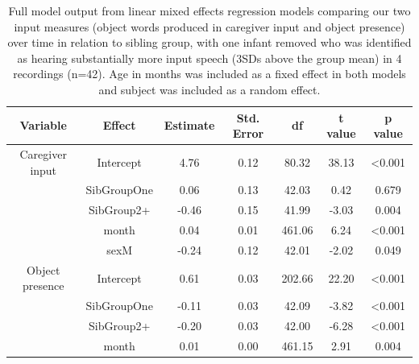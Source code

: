 \documentclass[
  english,
  man,floatsintext]{apa6}
\begin{document}
\begin{longtable}[t]{ccccccc}
\caption{\label{tab:table-input-model-summary-red}Full model output from linear mixed effects regression models comparing our two input measures (object words produced in caregiver input and object presence) over time in relation to sibling group, with one infant removed who was identified as hearing substantially more input speech (3SDs above the group mean) in 4 recordings (n=42). Age in months was included as a fixed effect in both models and subject was included as a random effect.}\\
\toprule
Variable & Effect & Estimate & Std. Error & df & t value & p value\\
\midrule
Caregiver input & Intercept & 4.76 & 0.12 & 80.32 & 38.13 & <0.001\\
 & SibGroupOne & 0.06 & 0.13 & 42.03 & 0.42 & 0.679\\
 & SibGroup2+ & -0.46 & 0.15 & 41.99 & -3.03 & 0.004\\
 & month & 0.04 & 0.01 & 461.06 & 6.24 & <0.001\\
 & sexM & -0.24 & 0.12 & 42.01 & -2.02 & 0.049\\
\midrule
\addlinespace
Object presence & Intercept & 0.61 & 0.03 & 202.66 & 22.20 & <0.001\\
 & SibGroupOne & -0.11 & 0.03 & 42.09 & -3.82 & <0.001\\
 & SibGroup2+ & -0.20 & 0.03 & 42.00 & -6.28 & <0.001\\
 & month & 0.01 & 0.00 & 461.15 & 2.91 & 0.004\\
\bottomrule
\end{longtable}
\end{document}
